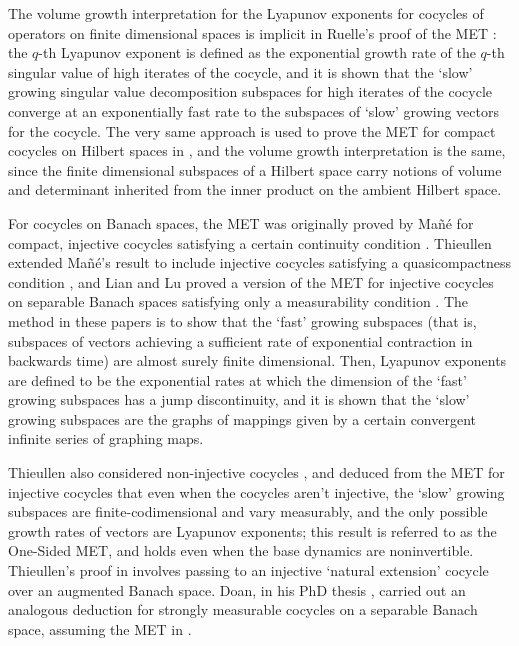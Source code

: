 \documentclass[11pt]{amsart}
\theoremstyle{theorem}
\theoremstyle{definition}
\numberwithin{equation}{section}
\begin{document}
The volume growth interpretation for the Lyapunov exponents for cocycles of operators on finite dimensional spaces is implicit in Ruelle's proof of the MET \cite{R1}: the $q$-th Lyapunov exponent is defined as the exponential growth rate of the $q$-th singular value of high iterates of the cocycle, and it is shown that the `slow' growing singular value decomposition subspaces for high iterates of the cocycle converge at an exponentially fast rate to the subspaces of `slow' growing vectors for the cocycle. The very same approach is used to prove the MET for compact cocycles on Hilbert spaces in \cite{R2}, and the volume growth interpretation is the same, since the finite dimensional subspaces of a Hilbert space carry notions of volume and determinant inherited from the inner product on the ambient Hilbert space. 

For cocycles on Banach spaces, the MET was originally proved by Ma{\~n}{\'e} for compact, injective cocycles satisfying a certain continuity condition \cite{M}.  Thieullen extended Ma{\~n}{\'e}'s result to include injective cocycles satisfying a quasicompactness condition \cite{T}, and Lian and Lu proved a version of the MET for injective cocycles on separable Banach spaces satisfying only a measurability condition \cite{LL}. The method in these papers is to show that the `fast' growing subspaces (that is, subspaces of vectors achieving a sufficient rate of exponential contraction in backwards time) are almost surely finite dimensional.  Then, Lyapunov exponents are defined to be the exponential rates at which the dimension of the `fast' growing subspaces has a jump discontinuity, and it is shown that the `slow' growing subspaces are the graphs of mappings given by a certain convergent infinite series of graphing maps.

Thieullen also considered non-injective cocycles \cite{T}, and deduced from the MET for injective cocycles that even when the cocycles aren't injective, the `slow' growing subspaces are finite-codimensional and vary measurably, and the only possible growth rates of vectors are  Lyapunov exponents; this result is referred to as the One-Sided MET, and holds even when the base dynamics are noninvertible. Thieullen's proof in \cite{T} involves passing to an injective `natural extension' cocycle over an augmented Banach space. Doan, in his PhD thesis \cite{Doan}, carried out an analogous deduction for strongly measurable cocycles on a separable Banach space, assuming the MET in \cite{LL}.
\end{document}
